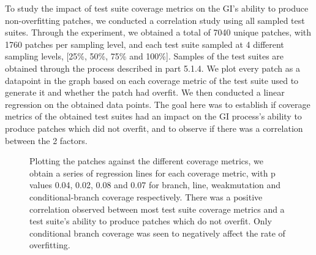 \documentclass[titlepage]{article}
\begin{document}
To study the impact of test suite coverage metrics on the GI’s ability to produce non-overfitting patches, we conducted a correlation study using all sampled test suites. Through the experiment, we obtained a total of 7040 unique patches, with 1760 patches per sampling level, and each test suite sampled at 4 different sampling levels, [25\%, 50\%, 75\% and 100\%]. Samples of the test suites are obtained through the process described in part 5.1.4. We plot every patch as a datapoint in the graph based on each coverage metric of the test suite used to generate it and whether the patch had overfit. We then conducted a linear regression on the obtained data points. The goal here was to establish if coverage metrics of the obtained test suites had an impact on the GI process’s ability to produce patches which did not overfit, and to observe if there was a correlation between the 2 factors. 

\begin{figure}
	\begin{center}
    \caption{Plotting the patches against the different coverage metrics, we obtain a series of regression lines for each coverage metric, with p values 0.04, 0.02, 0.08 and 0.07 for branch, line, weakmutation and conditional-branch coverage respectively. There was a positive correlation observed between most test suite coverage metrics and a test suite’s ability to produce patches which do not overfit. Only conditional branch coverage was seen to negatively affect the rate of overfitting. }
    \end{center}
\end{figure}
\end{document}
